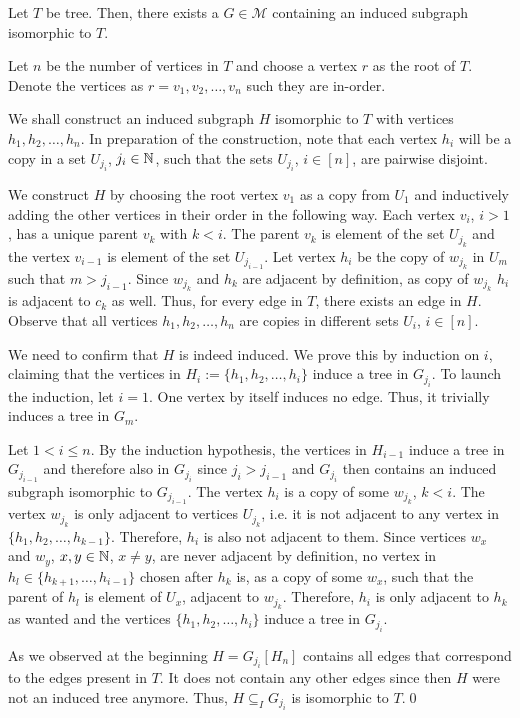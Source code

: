 \begin{thm}
Let $T$ be tree. Then, there exists a $G\in\mathcal{M}$ containing an induced subgraph isomorphic to $T$.
\end{thm}
\begin{prf}
Let $n$ be the number of vertices in $T$ and choose a vertex $r$ as the root of $T$. Denote the vertices as $r=v_1, v_2, \dots , v_n$ such they are in-order.

We shall construct an induced subgraph $H$ isomorphic to $T$ with vertices $h_1, h_2, \dots , h_n$. In preparation of the construction, note that each vertex $h_i$ will be a copy in a set $U_{j_i}$, $j_i\in\mathbb{N}$, such that the sets $U_{j_i}$, $i\in [n]$, are pairwise disjoint.

We construct $H$ by choosing the root vertex $v_1$ as a copy from $U_1$ and inductively adding the other vertices in their order in the following way. Each vertex $v_i$, $i>1$, has a unique parent $v_k$ with $k<i$. The parent $v_k$ is element of the set $U_{j_k}$ and the vertex $v_{i-1}$ is element of the set $U_{j_{i-1}}$. Let vertex $h_i$ be the copy of $w_{j_k}$ in $U_m$ such that $m> j_{i-1}$. Since $w_{j_k}$ and $h_k$ are adjacent by definition, as copy of $w_{j_k}$ $h_i$ is adjacent to $c_k$ as well. Thus, for every edge in $T$, there exists an edge in $H$. Observe that all vertices $h_1, h_2, \dots , h_n$ are copies in different sets $U_i$, $i\in [n]$. 

We need to confirm that $H$ is indeed induced. We prove this by induction on $i$, claiming that the vertices in $H_i:=\lbrace h_1, h_2, \dots , h_i\rbrace$ induce a tree in $G_{j_i}$. To launch the induction, let $i=1$. One vertex by itself induces no edge. Thus, it trivially induces a tree in $G_m$.

Let $1<i\leq n$. By the induction hypothesis, the vertices in $H_{i-1}$ induce a tree in $G_{j_{i-1}}$ and therefore also in $G_{j_i}$ since $j_i >j_{i-1}$ and $G_{j_i}$ then contains an induced subgraph isomorphic to $G_{j_{i-1}}$. The vertex $h_i$ is a copy of some $w_{j_k}$, $k<i$. The vertex $w_{j_k}$ is only adjacent to vertices $U_{j_k}$, i.e. it is not adjacent to any vertex in $\lbrace h_1, h_2, \dots , h_{k-1}\rbrace$. Therefore, $h_i$ is also not adjacent to them. Since vertices $w_x$ and $w_y$, $x,y\in\mathbb{N}$, $x\neq y$, are never adjacent by definition, no vertex in $h_l\in\lbrace h_{k+1}, \dots , h_{i-1}\rbrace$ chosen after $h_k$ is, as a copy of some $w_x$, such that the parent of $h_l$ is element of $U_x$, adjacent to $w_{j_k}$. Therefore, $h_i$ is only adjacent to $h_k$ as wanted and the vertices $\lbrace h_1, h_2, \dots , h_i\rbrace$ induce a tree in $G_{j_i}$.

As we observed at the beginning $H=G_{j_i}[H_n]$ contains all edges that correspond to the edges present in $T$. It does not contain any other edges since then $H$ were not an induced tree anymore. Thus, $H\subseteq_I G_{j_i}$ is isomorphic to $T$.\qed
\end{prf}
